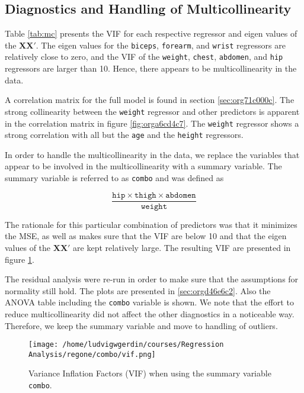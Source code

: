 \documentclass[11pt]{article}
\begin{document}
\subsection{Diagnostics and Handling of Multicollinearity}
\label{sec:orgce6c97e}

Table \ref{tab:mc} presents the VIF for each respective regressor and eigen values of the
\(\textbf{X}\textbf{X}'\). The eigen values for the 
\texttt{biceps}, \texttt{forearm}, and \texttt{wrist} regressors are relatively close to zero, and the
VIF of the \texttt{weight}, \texttt{chest}, \texttt{abdomen}, and \texttt{hip} regressors are larger than 10.
Hence, there appears to be multicollinearity in the data.

A correlation matrix for the full model is found in section \ref{sec:org71c000c}. The strong collinearity
between the \texttt{weight} regressor and other predictors is apparent in the correlation matrix in figure
\ref{fig:orga6cd4c7}. The \texttt{weight} regressor shows a strong correlation with all but the \texttt{age} and
the \texttt{height} regressors.

In order to handle the multicollinearity in the data, we replace the variables that appear to be involved 
in the multicollinearity with a summary variable. \cite{Montgomery2012} The summary variable is referred to as
\texttt{combo} and was defined as

\[
   \frac{\texttt{hip}\times\texttt{thigh}\times\texttt{abdomen}}{\texttt{weight}}   
   \]

The rationale for this particular combination of predictors was that it minimizes the MSE, as well as makes sure
that the VIF are below 10 and that the eigen values of the \(\textbf{X}\textbf{X}'\) are kept relatively 
large. The resulting VIF are presented in figure \ref{fig:org9a62b39}. 

The residual analysis were re-run in order to make sure that the assumptions for normality still hold.
The plots are presented in \ref{sec:orgd46e6c2}. Also the ANOVA table including the \texttt{combo} variable 
is shown. We note that the effort to reduce multicollinearity did not affect the
other diagnostics in a noticeable way. Therefore, we keep the summary variable and move to handling of outliers.

 

\begin{figure}[htbp]
\centering
\texttt{[image: /home/ludvigwgerdin/courses/Regression Analysis/regone/combo/vif.png]}
\caption{\label{fig:org9a62b39}
Variance Inflation Factors (VIF) when using the summary variable \texttt{combo}.}
\end{figure}   
\end{document}
